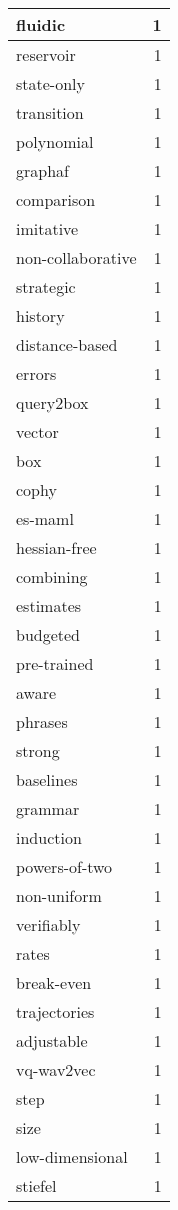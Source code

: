 \begin{table}[h]
\begin{tabular}{|l|r|}
\hline
fluidic & 1 \\
\hline
reservoir & 1 \\
\hline
state-only & 1 \\
\hline
transition & 1 \\
\hline
polynomial & 1 \\
\hline
graphaf & 1 \\
\hline
comparison & 1 \\
\hline
imitative & 1 \\
\hline
non-collaborative & 1 \\
\hline
strategic & 1 \\
\hline
history & 1 \\
\hline
distance-based & 1 \\
\hline
errors & 1 \\
\hline
query2box & 1 \\
\hline
vector & 1 \\
\hline
box & 1 \\
\hline
cophy & 1 \\
\hline
es-maml & 1 \\
\hline
hessian-free & 1 \\
\hline
combining & 1 \\
\hline
estimates & 1 \\
\hline
budgeted & 1 \\
\hline
pre-trained & 1 \\
\hline
aware & 1 \\
\hline
phrases & 1 \\
\hline
strong & 1 \\
\hline
baselines & 1 \\
\hline
grammar & 1 \\
\hline
induction & 1 \\
\hline
powers-of-two & 1 \\
\hline
non-uniform & 1 \\
\hline
verifiably & 1 \\
\hline
rates & 1 \\
\hline
break-even & 1 \\
\hline
trajectories & 1 \\
\hline
adjustable & 1 \\
\hline
vq-wav2vec & 1 \\
\hline
step & 1 \\
\hline
size & 1 \\
\hline
low-dimensional & 1 \\
\hline
stiefel & 1 \\

\end{tabular}
\end{table}

